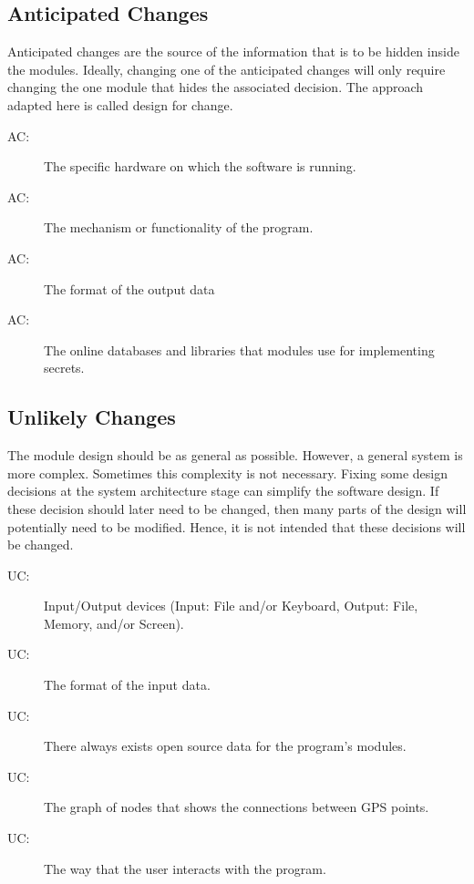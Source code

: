 \documentclass[12pt, titlepage]{article}
\newcounter{acnum}
\newcommand{\actheacnum}{AC\theacnum}
\newcounter{ucnum}
\newcommand{\uctheucnum}{UC\theucnum}
\begin{document}
\subsection{Anticipated Changes} \label{SecAchange}

Anticipated changes are the source of the information that is to be hidden
inside the modules. Ideally, changing one of the anticipated changes will only
require changing the one module that hides the associated decision. The approach
adapted here is called design for
change.

\begin{description}
\item[ \actheacnum \label{acHardware}:] The specific
  hardware on which the software is running.
\item[ \actheacnum \label{acMechFunc}:] The mechanism or 
  functionality of the program.
\item[ \actheacnum \label{acOutput}:] The format of
  the output data
\item[ \actheacnum \label{acOnlineLibraries}:] The online databases and libraries that modules use for implementing secrets. 
\end{description}

\subsection{Unlikely Changes} \label{SecUchange}

The module design should be as general as possible. However, a general system is
more complex. Sometimes this complexity is not necessary. Fixing some design
decisions at the system architecture stage can simplify the software design. If
these decision should later need to be changed, then many parts of the design
will potentially need to be modified. Hence, it is not intended that these
decisions will be changed.

\begin{description}
\item[ \uctheucnum \label{ucIO}:] Input/Output devices
  (Input: File and/or Keyboard, Output: File, Memory, and/or Screen).
\item[ \uctheucnum \label{ucInput}:] The format of the
  input data.
\item[ \uctheucnum \label{ucSource}:] There always exists
  open source data for the program's modules.
\item[ \uctheucnum \label{ucNodes}:] The graph of nodes
  that shows the connections between GPS points.
\item[ \uctheucnum \label{ucInteraction}:] The way that 
  the user interacts with the program.
\end{description}
\end{document}
